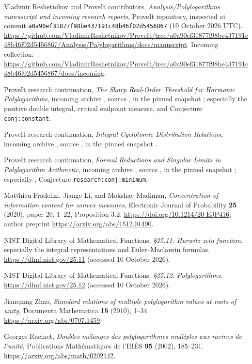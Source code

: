 Vladimir Reshetnikov and ProveIt contributors,
\emph{Analysis/Polylogarithms manuscript and incoming research reports},
ProveIt repository, inspected at commit
\texttt{a0a90ef31877f98be437191c48b46f02d5456867} (10 October 2026 UTC).
\url{https://github.com/VladimirReshetnikov/ProveIt/tree/a0a90ef31877f98be437191c48b46f02d5456867/Analysis/Polylogarithms/docs/manuscript}.
Incoming collection:
\url{https://github.com/VladimirReshetnikov/ProveIt/tree/a0a90ef31877f98be437191c48b46f02d5456867/docs/incoming}.

ProveIt research continuation,
\emph{The Sharp Real-Order Threshold for Harmonic Polylogarithms},
incoming archive ,
source ,
in the pinned snapshot \cite{repo}; especially the positive double
integral, critical endpoint measure, and Conjecture \texttt{conj:constant}.

ProveIt research continuation,
\emph{Integral Cyclotomic Distribution Relations},
incoming archive ,
source ,
in the pinned snapshot \cite{repo}.

ProveIt research continuation,
\emph{Formal Reductions and Singular Limits in Polylogarithm Arithmetic},
incoming archive
,
source ,
in the pinned snapshot \cite{repo}; especially
, Conjecture \texttt{research:conj:minimum}.

Matthieu Fradelizi, Jiange Li, and Mokshay Madiman,
\emph{Concentration of information content for convex measures},
Electronic Journal of Probability \textbf{25} (2020), paper 20, 1--22,
Proposition 3.2.
\url{https://doi.org/10.1214/20-EJP416};
author preprint \url{https://arxiv.org/abs/1512.01490}.

NIST Digital Library of Mathematical Functions,
\emph{\S25.11: Hurwitz zeta function}, especially the integral
representations and Euler--Maclaurin formulas.
\url{https://dlmf.nist.gov/25.11} (accessed 10 October 2026).

NIST Digital Library of Mathematical Functions,
\emph{\S25.12: Polylogarithms}.
\url{https://dlmf.nist.gov/25.12} (accessed 10 October 2026).

Jianqiang Zhao,
\emph{Standard relations of multiple polylogarithm values at roots of unity},
Documenta Mathematica \textbf{15} (2010), 1--34.
\url{https://arxiv.org/abs/0707.1459}.

Georges Racinet,
\emph{Doubles m\'elanges des polylogarithmes multiples aux racines de l'unit\'e},
Publications Math\'ematiques de l'IH\'ES \textbf{95} (2002), 185--231.
\url{https://arxiv.org/abs/math/0202142}.
